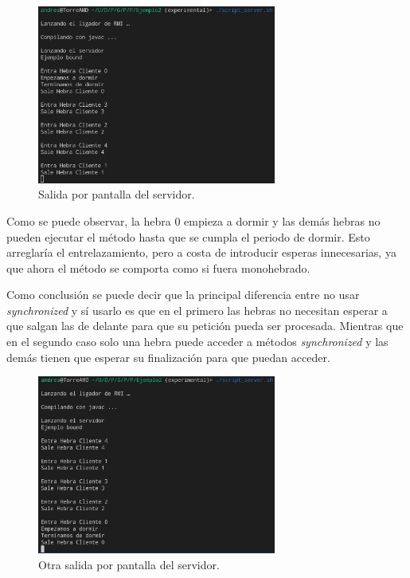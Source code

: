 \documentclass{article}
\begin{document}
\begin{figure}[H]
    \centering
    \includegraphics[width=0.7\textwidth]{imagenes/E2ServerSync1.png}
    \caption{Salida por pantalla del servidor.}
\end{figure}

Como se puede observar, la hebra 0 empieza a dormir y las demás hebras no pueden ejecutar el método hasta que se cumpla el periodo de dormir. Esto arreglaría el entrelazamiento, pero a costa de introducir esperas innecesarias, ya que ahora el método se comporta como si fuera monohebrado.

Como conclusión se puede decir que la principal diferencia entre no usar \textit{synchronized} y sí usarlo es que en el primero las hebras no necesitan esperar a que salgan las de delante para que su petición pueda ser procesada. Mientras que en el segundo caso solo una hebra puede acceder a métodos \textit{synchronized} y las demás tienen que esperar su finalización para que puedan acceder.

\begin{figure}[H]
    \centering
    \includegraphics[width=0.7\textwidth]{imagenes/E2ServerSync2.png}
    \caption{Otra salida por pantalla del servidor.}
\end{figure}
\end{document}
